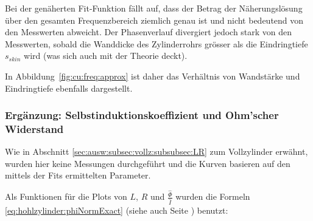 {	\begin{minipage}[t]{0.33\textwidth}
        \vspace{0pt}

        Bei  der  gen\"aherten  Fit-Funktion  f\"allt  auf,  dass  der  Betrag
        der N\"aherungsl\"osung  \"uber den gesamten  Frequenzbereich ziemlich
        genau  ist  und nicht  bedeutend  von  den Messwerten  abweicht.   Der
        Phasenverlauf divergiert  jedoch stark von den  Messwerten, sobald die
        Wanddicke des Zylinderrohrs gr\"osser als die Eindringtiefe $s_{skin}$
        wird (was sich auch mit der Theorie deckt).

        In Abbildung~\ref{fig:cu:freq:approx}  ist daher das  Verh\"altnis von
        Wandst\"arke und Eindringtiefe ebenfalls dargestellt.
        
	\end{minipage}%
	\begin{minipage}[t]{0.67\textwidth}
        \vspace{0pt}\raggedright
        \resizebox{.95\textwidth}{!}{}
        \label{fig:cu:freq:approx}
	\end{minipage}


	\begin{minipage}[t]{0.33\textwidth}
        \vspace{0pt}
        \subsubsection{%
            Erg\"anzung: Selbstinduktionskoeffizient und Ohm'scher Widerstand}
        \label{sec:ausw:subsec:hohlz:cu:subsubsec:LR}

        Wie   in    Abschnitt   \ref{sec:ausw:subsec:vollz:subsubsec:LR}   zum
        Vollzylinder erw\"ahnt, wurden hier keine Messungen durchgef\"uhrt und
        die Kurven basieren auf den mittels der Fits ermittelten Parameter.

        Als     Funktionen     f\"ur     die    Plots     von     $L$,     $R$
        und      $\frac{\hat{\Phi}}{\hat{I}}$      wurden     die      Formeln
        \ref{eq:hohlzylinder:phiNormExact}       (siehe       auch       Seite
        \pageref{eq:hohlzylinder:phiNormExact}) benutzt:


\end{minipage}}
